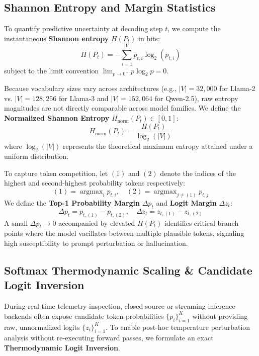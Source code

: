 \documentclass[10pt,twocolumn]{article}
\begin{document}
\subsection{Shannon Entropy and Margin Statistics}
To quantify predictive uncertainty at decoding step $t$, we compute the instantaneous \textbf{Shannon entropy} $H(P_t)$ in bits:
\begin{equation}
H(P_t) = -\sum_{i=1}^{|V|} p_{t,i} \log_2(p_{t,i})
\end{equation}
subject to the limit convention $\lim_{p \to 0^+} p \log_2 p = 0$.

Because vocabulary sizes vary across architectures (e.g., $|V| = 32{,}000$ for Llama-2 vs. $|V| = 128{,}256$ for Llama-3 and $|V| = 152{,}064$ for Qwen-2.5), raw entropy magnitudes are not directly comparable across model families. We define the \textbf{Normalized Shannon Entropy} $H_{\text{norm}}(P_t) \in [0, 1]$:
\begin{equation}
H_{\text{norm}}(P_t) = \frac{H(P_t)}{\log_2(|V|)}
\end{equation}
where $\log_2(|V|)$ represents the theoretical maximum entropy attained under a uniform distribution.

To capture token competition, let $(1)$ and $(2)$ denote the indices of the highest and second-highest probability tokens respectively:
\begin{equation}
(1) = \operatorname{argmax}_i p_{t,i}, \quad (2) = \operatorname{argmax}_{j \neq (1)} p_{t,j}
\end{equation}
We define the \textbf{Top-1 Probability Margin} $\Delta p_t$ and \textbf{Logit Margin} $\Delta z_t$:
\begin{equation}
\Delta p_t = p_{t,(1)} - p_{t,(2)}, \quad \Delta z_t = z_{t,(1)} - z_{t,(2)}
\end{equation}
A small $\Delta p_t \to 0$ accompanied by elevated $H(P_t)$ identifies critical branch points where the model vacillates between multiple plausible tokens, signaling high susceptibility to prompt perturbation or hallucination.

\subsection{Softmax Thermodynamic Scaling \& Candidate Logit Inversion}
During real-time telemetry inspection, closed-source or streaming inference backends often expose candidate token probabilities $\{p_i\}_{i=1}^K$ without providing raw, unnormalized logits $\{z_i\}_{i=1}^K$. To enable post-hoc temperature perturbation analysis without re-executing forward passes, we formulate an exact \textbf{Thermodynamic Logit Inversion}.
\end{document}
